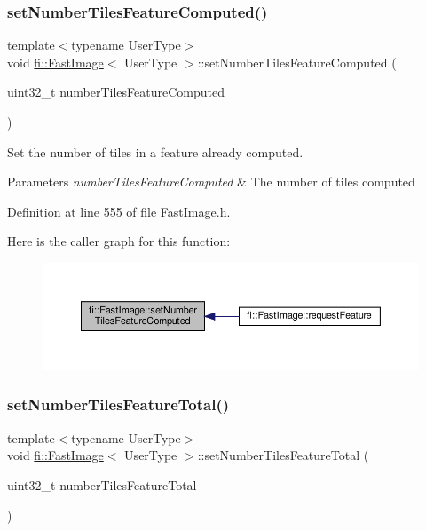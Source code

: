\subsubsection{\texorpdfstring{set\+Number\+Tiles\+Feature\+Computed()}{setNumberTilesFeatureComputed()}}
{\footnotesize\ttfamily template$<$typename User\+Type$>$ \\
void \hyperlink{classfi_1_1FastImage}{fi\+::\+Fast\+Image}$<$ User\+Type $>$\+::set\+Number\+Tiles\+Feature\+Computed (\begin{DoxyParamCaption}\item[{uint32\+\_\+t}]{number\+Tiles\+Feature\+Computed }\end{DoxyParamCaption})\hspace{0.3cm}{\ttfamily [inline]}}



Set the number of tiles in a feature already computed. 


\begin{DoxyParams}{Parameters}
{\em number\+Tiles\+Feature\+Computed} & The number of tiles computed \\
\hline
\end{DoxyParams}


Definition at line 555 of file Fast\+Image.\+h.

Here is the caller graph for this function\+:
\nopagebreak
\begin{figure}[H]
\begin{center}
\leavevmode
\includegraphics[width=350pt]{dc/d6b/classfi_1_1FastImage_a8b88d3cfcc2acc2e6d6d4baa2185cf9a_icgraph}
\end{center}
\end{figure}
\mbox{\label{classfi_1_1FastImage_a7313f9c3bddf643dfab8cf026527651a}} 
\subsubsection{\texorpdfstring{set\+Number\+Tiles\+Feature\+Total()}{setNumberTilesFeatureTotal()}}
{\footnotesize\ttfamily template$<$typename User\+Type$>$ \\
void \hyperlink{classfi_1_1FastImage}{fi\+::\+Fast\+Image}$<$ User\+Type $>$\+::set\+Number\+Tiles\+Feature\+Total (\begin{DoxyParamCaption}\item[{uint32\+\_\+t}]{number\+Tiles\+Feature\+Total }\end{DoxyParamCaption})\hspace{0.3cm}{\ttfamily [inline]}}



